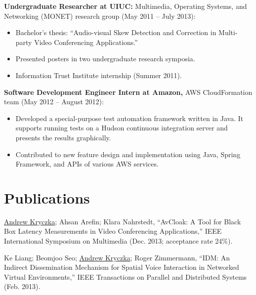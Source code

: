 \documentclass{res}
\begin{document}
\begin{resume}
    {\bf Undergraduate Researcher at UIUC:} Multimedia, Operating Systems, and Networking (MONET) research group (May
    2011 -- July 2013):
    \begin{itemize}
        \item Bachelor's thesis: ``Audio-visual Skew Detection and Correction in Multi-party Video Conferencing
            Applications.''
        \item Presented posters in two undergraduate research symposia.
        \item Information Trust Institute internship (Summer 2011).
    \end{itemize}

    {\bf Software Development Engineer Intern at Amazon,} AWS CloudFormation team (May 2012 -- August 2012):
    \begin{itemize}
        \item Developed a special-purpose test automation framework written in Java. It supports running tests on a
            Hudson continuous
    integration server and presents the results graphically.
        \item Contributed to new feature design and implementation using Java, Spring Framework, and APIs of various AWS services.
    \end{itemize}

\section{Publications}
\vspace{0.1in}

\underline{Andrew Kryczka}; Ahsan Arefin; Klara Nahrstedt, ``AvCloak: A Tool for Black Box Latency Measurements in Video
Conferencing Applications,'' IEEE International Symposium on Multimedia (Dec. 2013; acceptance rate 24\%).

Ke Liang; Beomjoo Seo; \underline{Andrew Kryczka}; Roger Zimmermann, ``IDM: An Indirect Dissemination Mechanism for Spatial Voice
Interaction in Networked Virtual Environments,'' IEEE Transactions on Parallel and Distributed Systems (Feb. 2013).
\end{resume}
\end{document}
